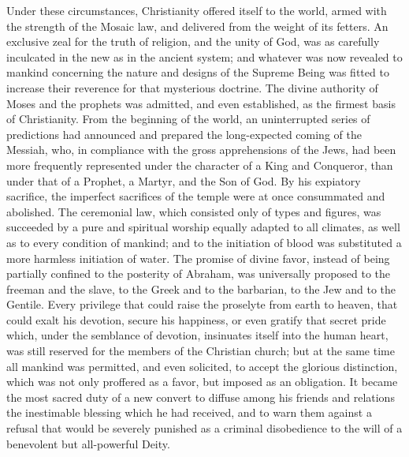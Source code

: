 



Under these circumstances, Christianity offered itself to the
world, armed with the strength of the Mosaic law, and delivered
from the weight of its fetters. An exclusive zeal for the truth
of religion, and the unity of God, was as carefully inculcated in
the new as in the ancient system; and whatever was now revealed
to mankind concerning the nature and designs of the Supreme Being
was fitted to increase their reverence for that mysterious
doctrine. The divine authority of Moses and the prophets was
admitted, and even established, as the firmest basis of
Christianity. From the beginning of the world, an uninterrupted
series of predictions had announced and prepared the
long-expected coming of the Messiah, who, in compliance with the
gross apprehensions of the Jews, had been more frequently
represented under the character of a King and Conqueror, than
under that of a Prophet, a Martyr, and the Son of God. By his
expiatory sacrifice, the imperfect sacrifices of the temple were
at once consummated and abolished. The ceremonial law, which
consisted only of types and figures, was succeeded by a pure and
spiritual worship equally adapted to all climates, as well as to
every condition of mankind; and to the initiation of blood was
substituted a more harmless initiation of water. The promise of
divine favor, instead of being partially confined to the
posterity of Abraham, was universally proposed to the freeman and
the slave, to the Greek and to the barbarian, to the Jew and to
the Gentile. Every privilege that could raise the proselyte from
earth to heaven, that could exalt his devotion, secure his
happiness, or even gratify that secret pride which, under the
semblance of devotion, insinuates itself into the human heart,
was still reserved for the members of the Christian church; but
at the same time all mankind was permitted, and even solicited,
to accept the glorious distinction, which was not only proffered
as a favor, but imposed as an obligation. It became the most
sacred duty of a new convert to diffuse among his friends and
relations the inestimable blessing which he had received, and to
warn them against a refusal that would be severely punished as a
criminal disobedience to the will of a benevolent but
all-powerful Deity.

